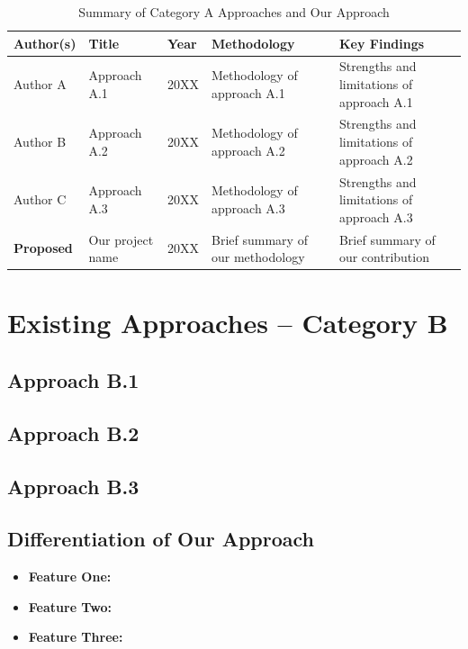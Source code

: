 \documentclass[12pt, a4paper, oneside]{report}
\begin{document}
\begin{table}[H]
\centering
\caption{Summary of Category A Approaches and Our Approach}
\label{tab:cat-a-comparison}
\small
\begin{tabularx}{\textwidth}{|l|l|l|X|X|}
\hline
\textbf{Author(s)} & \textbf{Title} & \textbf{Year} & \textbf{Methodology} & \textbf{Key Findings} \\
\hline
Author A \cite{ref1} & Approach A.1 & 20XX & Methodology of approach A.1 & Strengths and limitations of approach A.1 \\
\hline
Author B \cite{ref2} & Approach A.2 & 20XX & Methodology of approach A.2 & Strengths and limitations of approach A.2 \\
\hline
Author C \cite{ref3} & Approach A.3 & 20XX & Methodology of approach A.3 & Strengths and limitations of approach A.3 \\
\hline
\textbf{Proposed} & Our project name & 20XX & Brief summary of our methodology & Brief summary of our contribution \\
\hline
\end{tabularx}
\end{table}

\section{Existing Approaches -- Category B}
\label{sec:category-b}

\lipsum[38][1-4]

\subsection{Approach B.1}
\lipsum[39][1-3] \cite{ref4}

\subsection{Approach B.2}
\lipsum[40][1-3] \cite{ref5}

\subsection{Approach B.3}
\lipsum[41][1-3] \cite{ref6}

\subsection{Differentiation of Our Approach}
\lipsum[42][1-2]

\begin{itemize}
    \item \textbf{Feature One:} \lipsum[43][1-1]
    \item \textbf{Feature Two:} \lipsum[44][1-1]
    \item \textbf{Feature Three:} \lipsum[45][1-1]
\end{itemize}
\end{document}
